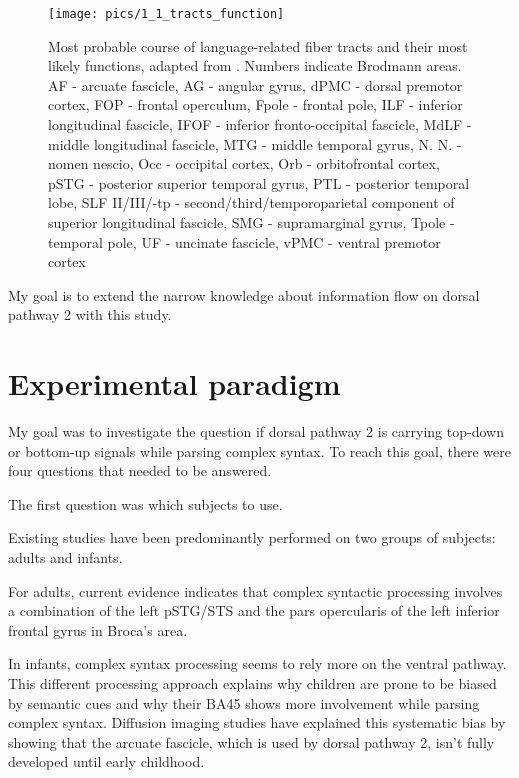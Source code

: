 \begin{figure}[h]
\begin{center}
\vspace{7mm}
\texttt{[image: pics/1\_1\_tracts\_function]}
\caption{\label{1.1.neuron.illustrated} Most probable course of language-related fiber tracts and their most likely functions, adapted from \protect\cite{1.1.Gierhan}. Numbers indicate Brodmann areas. AF - arcuate fascicle, AG - angular gyrus, dPMC - dorsal premotor cortex, FOP - frontal operculum, Fpole - frontal pole, ILF - inferior longitudinal fascicle, IFOF - inferior fronto-occipital fascicle, MdLF - middle longitudinal fascicle, MTG - middle temporal gyrus, N. N. - nomen nescio, Occ - occipital cortex, Orb - orbitofrontal cortex, pSTG - posterior superior temporal gyrus, PTL - posterior temporal lobe, SLF II/III/-tp - second/third/temporoparietal component of superior longitudinal fascicle, SMG - supramarginal gyrus, Tpole - temporal pole, UF - uncinate fascicle, vPMC - ventral premotor cortex}
\end{center}
\end{figure}

My goal is to extend the narrow knowledge about information flow on dorsal pathway 2 with this study.\section{Experimental paradigm}

My goal was to investigate the question if dorsal pathway 2 is carrying top-down or bottom-up signals while parsing complex syntax.
To reach this goal, there were four questions that needed to be answered.


The first question was which subjects to use.

Existing studies have been predominantly performed on two groups of subjects: adults and infants.

For adults, current evidence indicates that complex syntactic processing involves a combination of the left pSTG/STS and the pars opercularis of the left inferior frontal gyrus in Broca's area.

In infants, complex syntax processing seems to rely more on the ventral pathway.
This different processing approach explains why children are prone to be biased by semantic cues and why their BA45 shows more involvement while parsing complex syntax.
Diffusion imaging studies have explained this systematic bias by showing that the arcuate fascicle, which is used by dorsal pathway 2, isn't fully developed until early childhood.


